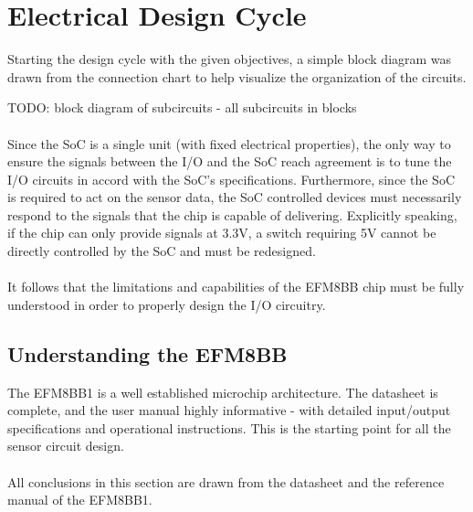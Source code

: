 \documentclass[12pt]{article}
\begin{document}
	\section{Electrical Design Cycle\label{sec:devel-electr-design}} 

  Starting the design cycle with the given objectives, a simple block diagram was drawn from the connection chart to help visualize the organization of the circuits.

  TODO: block diagram of subcircuits - all subcircuits in blocks

  \paragraph{}
  Since the SoC is a single unit (with fixed electrical properties), the only way to ensure the signals between the I/O and the SoC reach agreement is to tune the I/O circuits in accord with the SoC's specifications. Furthermore, since the SoC is required to act on the sensor data, the SoC controlled devices must necessarily respond to the signals that the chip is capable of delivering. Explicitly speaking, if the chip can only provide signals at 3.3V, a switch requiring 5V cannot be directly controlled by the SoC and must be redesigned.
  
  \paragraph{}
  It follows that the limitations and capabilities of the EFM8BB chip must be fully understood in order to properly design the I/O circuitry.
  
  \subsection{Understanding the EFM8BB\label{sec:understanding-soc}}

  The EFM8BB1 is a well established microchip architecture. The datasheet is complete, and the user manual highly informative - with detailed input/output specifications and operational instructions. This is the starting point for all the sensor circuit design.


  \paragraph{}
  All conclusions in this section are drawn from the datasheet \cite{silabs:efm8bb1ds} and the reference manual\cite{silabs:efm8bb1rm} of the EFM8BB1. 
\end{document}
